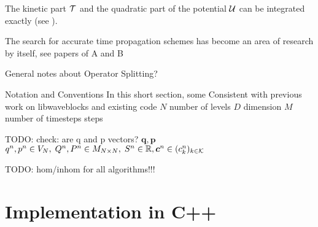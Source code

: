 The kinetic part $\mathcal{T}$ and the quadratic part of the potential $\mathcal{U}$ can be integrated exactly (see \cite{FGL_semiclassical_dynamics}).


The search for accurate time propagation schemes has become an area of research by itself, see papers of A and B

General notes about Operator Splitting?

Notation and Conventions
%
In this short section, some 
Consistent with previous work on libwaveblocks and existing code
$N$ number of levels
$D$ dimension
$M$ number of timesteps steps

TODO: check: are q and p vectors? $\bm{q,p}$ \\
$q^n, p^n \in V_N, \; Q^n, P^n \in M_{N \times N}, \; S^n \in \mathbb{R}, \bm{c}^n \in (c_k^n)_{k \in \mathcal{K}}$

TODO: hom/inhom for all algorithms!!!











\clearpage
\section{Implementation in C++}

\begin{comment}
\cite{libwaveblocks}
What was the main challenge? What was controllable (which code could be changed), what not? 
Quick alternating o

The challenges were twofold: 
First, identifying of all the common basic building blocks and expressing all algorithms in terms of these components
Second, implementing all basic building blocks in a generic but efficient manner
Third, minimize the overhead for switching between function calls

 - encapsulate the functionality in a clean interface without loosing flexibility and 
 - write efficient/fast code

Tell how each of these challenges were overcome


Motivation of software design choices

	- Why class structure/inheritance (explain hierarchy)
	- CRTP / static polymorphism \cite{C_CRTP}
	- recognizing IP
	- callback function
	- implementation of IntSplit (TU,UT, partial specialization)
	- polymorphism through enable-if




\clearpage
\end{comment}
